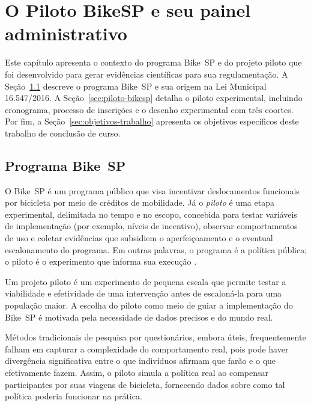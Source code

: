 
\chapter{O Piloto BikeSP e seu painel administrativo}
\label{cap:contexto-painel}

Este capítulo apresenta o contexto do programa Bike~SP e do projeto piloto que foi desenvolvido para gerar evidências científicas para sua regulamentação. A Seção~\ref{sec:programa-bikesp} descreve o programa Bike~SP e sua origem na Lei Municipal 16.547/2016. A Seção~\ref{sec:piloto-bikesp} detalha o piloto experimental, incluindo cronograma, processo de inscrições e o desenho experimental com três coortes. Por fim, a Seção~\ref{sec:objetivos-trabalho} apresenta os objetivos específicos deste trabalho de conclusão de curso.

\section{Programa Bike~SP}
\label{sec:programa-bikesp}
O Bike~SP é um programa público que visa incentivar deslocamentos funcionais por
bicicleta por meio de créditos de mobilidade. Já o \textit{piloto} é uma etapa
experimental, delimitada no tempo e no escopo, concebida para testar variáveis
de implementação (por exemplo, níveis de incentivo), observar comportamentos de
uso e coletar evidências que subsidiem o aperfeiçoamento e o eventual
escalonamento do programa. Em outras palavras, o programa é a política pública;
o piloto é o experimento que informa sua execução
\citep{faria2023:bikespCaseStudy, interscity:pilotoBikeSP}.

Um projeto piloto é um experimento de pequena escala que permite testar a
viabilidade e efetividade de uma intervenção antes de escaloná-la para uma
população maior\citep{pearson2020}. A escolha do piloto como meio de guiar a
implementação do Bike~SP é motivada pela necessidade de dados precisos e do
mundo real.

Métodos tradicionais de pesquisa por questionários, embora úteis, frequentemente
falham em capturar a complexidade do comportamento real, pois pode haver
divergência significativa entre o que indivíduos afirmam que farão e o que
efetivamente fazem\citep{rundle2009}. Assim, o piloto simula a política real ao
compensar participantes por suas viagens de bicicleta, fornecendo dados sobre
como tal política poderia funcionar na prática.

